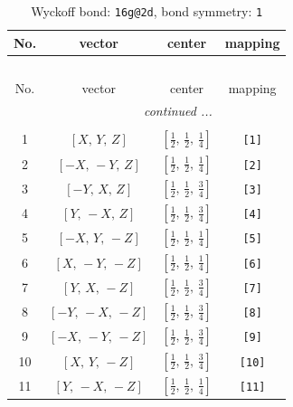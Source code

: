 \documentclass[fleqn,8pt]{jsarticle}
\begin{document}
\begin{longtable}{cccc}
\caption{Wyckoff bond: {\tt 16g@2d}, bond symmetry: {\tt 1}}
 \\
 \hline \hline
No. & vector & center & mapping \\ \hline \endfirsthead

\multicolumn{3}{l}{\tablename\ \thetable{}} \\
 \hline \hline
No. & vector & center & mapping \\ \hline \endhead

 \hline \hline
\multicolumn{3}{r}{\footnotesize\it continued ...} \\ \endfoot

 \hline \hline
\multicolumn{3}{r}{} \\ \endlastfoot

1 & $\left[ X,\, Y,\, Z \right]$ & $\left[ \frac{1}{2},\, \frac{1}{2},\, \frac{1}{4} \right]$ & {\tt [1]} \\ \hline
2 & $\left[ - X,\, - Y,\, Z \right]$ & $\left[ \frac{1}{2},\, \frac{1}{2},\, \frac{1}{4} \right]$ & {\tt [2]} \\ \hline
3 & $\left[ - Y,\, X,\, Z \right]$ & $\left[ \frac{1}{2},\, \frac{1}{2},\, \frac{3}{4} \right]$ & {\tt [3]} \\ \hline
4 & $\left[ Y,\, - X,\, Z \right]$ & $\left[ \frac{1}{2},\, \frac{1}{2},\, \frac{3}{4} \right]$ & {\tt [4]} \\ \hline
5 & $\left[ - X,\, Y,\, - Z \right]$ & $\left[ \frac{1}{2},\, \frac{1}{2},\, \frac{1}{4} \right]$ & {\tt [5]} \\ \hline
6 & $\left[ X,\, - Y,\, - Z \right]$ & $\left[ \frac{1}{2},\, \frac{1}{2},\, \frac{1}{4} \right]$ & {\tt [6]} \\ \hline
7 & $\left[ Y,\, X,\, - Z \right]$ & $\left[ \frac{1}{2},\, \frac{1}{2},\, \frac{3}{4} \right]$ & {\tt [7]} \\ \hline
8 & $\left[ - Y,\, - X,\, - Z \right]$ & $\left[ \frac{1}{2},\, \frac{1}{2},\, \frac{3}{4} \right]$ & {\tt [8]} \\ \hline
9 & $\left[ - X,\, - Y,\, - Z \right]$ & $\left[ \frac{1}{2},\, \frac{1}{2},\, \frac{3}{4} \right]$ & {\tt [9]} \\ \hline
10 & $\left[ X,\, Y,\, - Z \right]$ & $\left[ \frac{1}{2},\, \frac{1}{2},\, \frac{3}{4} \right]$ & {\tt [10]} \\ \hline
11 & $\left[ Y,\, - X,\, - Z \right]$ & $\left[ \frac{1}{2},\, \frac{1}{2},\, \frac{1}{4} \right]$ & {\tt [11]} \\ \hline

\end{longtable}
\end{document}
